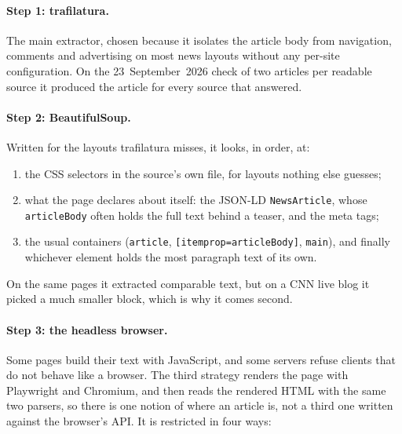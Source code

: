 \paragraph{Step 1: trafilatura.} The main extractor, chosen because it
isolates the article body from navigation, comments and advertising on
most news layouts without any per-site configuration. On the
23~September~2026 check of two articles per readable source it
produced the article for every source that answered.

\paragraph{Step 2: BeautifulSoup.} Written for the layouts trafilatura
misses, it looks, in order, at:
\begin{enumerate}
    \item the CSS selectors in the source's own file, for layouts
    nothing else guesses;
    \item what the page declares about itself: the JSON-LD
    \texttt{NewsArticle}, whose \texttt{articleBody} often holds the
    full text behind a teaser, and the meta tags;
    \item the usual containers (\texttt{article},
    \texttt{[itemprop=articleBody]}, \texttt{main}), and finally
    whichever element holds the most paragraph text of its own.
\end{enumerate}
On the same pages it extracted comparable text, but on a CNN live blog
it picked a much smaller block, which is why it comes second.

\paragraph{Step 3: the headless browser.} Some pages build their text
with JavaScript, and some servers refuse clients that do not behave
like a browser. The third strategy renders the page with Playwright and
Chromium, and then reads the rendered HTML with the same two parsers,
so there is one notion of where an article is, not a third one written
against the browser's API. It is restricted in four ways:

